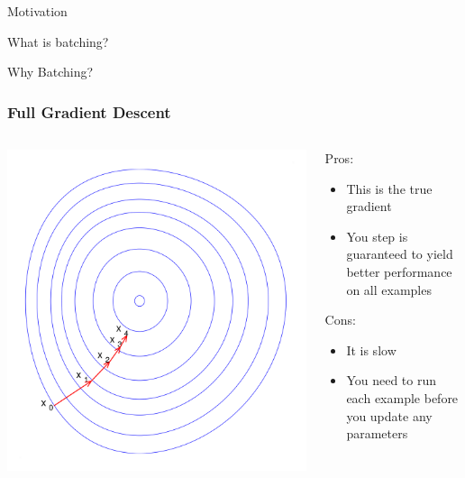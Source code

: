 \documentclass{beamer}
\begin{document}
\begin{section}{Motivation}
\begin{subsection}{What is batching?}
    \end{subsection} %

    \begin{subsection}{Why Batching?}

        \begin{frame}
            \frametitle{Full Gradient Descent}

            \begin{columns}
                \begin{column}{0.5\textwidth}
                    \includegraphics[width=\textwidth]{images/full-gradient-descent.png}
                \end{column}
                \begin{column}{0.5\textwidth}
                    Pros:
                    \begin{itemize}
                        \item This is the true gradient
                        \item You step is guaranteed to yield better performance on all examples
                    \end{itemize}
                    Cons:
                    \begin{itemize}
                        \item It is slow
                        \item You need to run each example before you update any parameters
                    \end{itemize}
                \end{column}
            \end{columns}


\end{frame}
\end{subsection}
\end{section}
\end{document}
